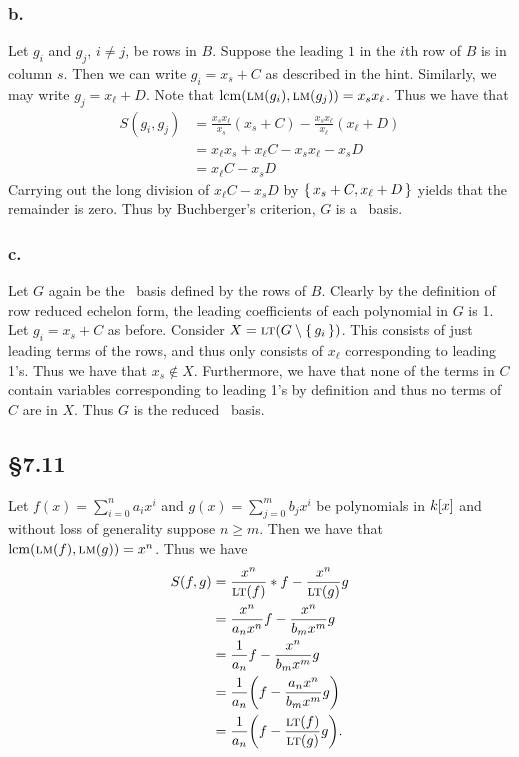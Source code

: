 \documentclass[letterpaper]{article}
\begin{document}
\clearpage

\subsubsection*{b.}

Let $g_{i}$ and $g_{j}$, $i \neq j$, be rows in $B$.
Suppose the leading $1$ in the $i$th row of $B$ is in column $s$.
Then we can write $g_{i} = x_{s} + C$ as described in the hint.
Similarly, we may write $g_{j} = x_{\ell} + D$.
Note that $\operatorname{lcm}(\operatorname{\textsc{lm}}(g_{i}), \operatorname{\textsc{lm}}(g_{j})) = x_{s}x_{\ell}$.
Thus we have that
\begin{align*}
  S(g_{i}, g_{j}) &= \frac{x_{s} x_{\ell}}{x_{s}}(x_{s} + C) - \frac{x_{s} x_{\ell}}{x_{\ell}} (x_{\ell} + D) \\
                  &= x_{\ell}x_{s} + x_{\ell} C - x_{s} x_{\ell} - x_{s} D \\
                  &= x_{\ell} C - x_{s} D
\end{align*}
Carrying out the long division of $x_{\ell} C - x_{s} D$ by $\set{x_{s} + C, x_{\ell} + D}$ yields that the remainder is zero.
Thus by Buchberger's criterion, $G$ is a \Grobner\ basis.

\subsubsection*{c.}

Let $G$ again be the \Grobner\ basis defined by the rows of $B$.
Clearly by the definition of row reduced echelon form, the leading coefficients of each polynomial in $G$ is 1.
Let $g_{i} = x_{s} + C$ as before.
Consider $X = \gen{\lt(G \setminus \set{g_{i}})}$.
This consists of just leading terms of the rows, and thus only consists of $x_{\ell}$ corresponding to leading 1's.
Thus we have that $x_{s} \notin X$.
Furthermore, we have that none of the terms in $C$ contain variables corresponding to leading 1's by definition and thus no terms of $C$ are in $X$.
Thus $G$ is the reduced \Grobner\ basis.

\subsection*{\S 7.11}

Let $f(x) = \sum_{i = 0}^{n} a_{i}x^{i}$ and $g(x) = \sum_{j = 0}^{m} b_{j} x^{i}$ be polynomials in $k\bqty{x}$ and without loss of generality suppose $n \geq m$.
Then we have that $\operatorname{lcm}(\operatorname{\textsc{lm}}(f), \operatorname{\textsc{lm}}(g)) = x^{n}$.
Thus we have
\begin{align*}
  S(f, g) &= \frac{x^{n}}{\lt(f)} * f - \frac{x^{n}}{\lt(g)}g \\
          &= \frac{x^{n}}{a_{n}x^{n}} f - \frac{x^{n}}{b_{m}x^{m}}g \\
          &= \frac{1}{a_{n}}f - \frac{x^{n}}{b_{m}x^{m}}g \\
          &= \frac{1}{a_{n}}\pqty{f - \frac{a_{n}x^{n}}{b_{m}x^{m}}g} \\
          &= \frac{1}{a_{n}}\pqty{f - \frac{\lt(f)}{\lt(g)}g}.
\end{align*}
\end{document}
